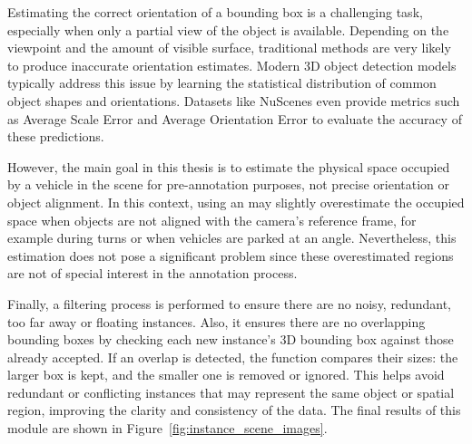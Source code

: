 Estimating the correct orientation of a bounding box is a challenging task, especially when only a partial view of the object is available. Depending on the viewpoint and the amount of visible surface, traditional methods are very likely to produce inaccurate orientation estimates. Modern 3D object detection models typically address this issue by learning the statistical distribution of common object shapes and orientations. Datasets like NuScenes even provide metrics such as Average Scale Error and Average Orientation Error to evaluate the accuracy of these predictions.

However, the main goal in this thesis is to estimate the physical space occupied by a vehicle in the scene for pre-annotation purposes, not precise orientation or object alignment. In this context, using an  may slightly overestimate the occupied space when objects are not aligned with the camera's reference frame, for example during turns or when vehicles are parked at an angle. Nevertheless, this estimation does not pose a significant problem since these overestimated regions are not of special interest in the annotation process.

Finally, a filtering process is performed to ensure there are no noisy, redundant, too far away or floating instances. Also, it ensures there are no overlapping bounding boxes by checking each new instance's 3D bounding box against those already accepted. If an overlap is detected, the function compares their sizes: the larger box is kept, and the smaller one is removed or ignored. This helps avoid redundant or conflicting instances that may represent the same object or spatial region, improving the clarity and consistency of the data. The final results of this module are shown in Figure~\ref{fig:instance_scene_images}.

